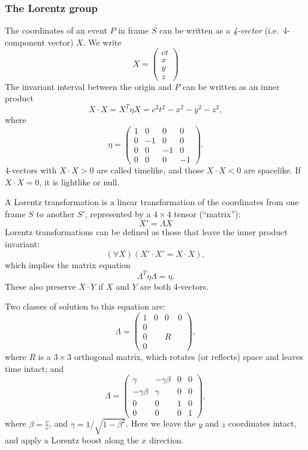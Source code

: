 \documentclass[a4paper]{article}
\begin{document}
\subsubsection*{The Lorentz group}
The coordinates of an event $P$ in frame $S$ can be written as a \emph{4-vector} (i.e.\ 4-component vector) $X$. We write
\[
  X =
  \begin{pmatrix}
    ct\\
    x\\
    y\\
    z
  \end{pmatrix}
\]
The invariant interval between the origin and $P$ can be written as an inner product
\[
  X\cdot X = X^T\eta X = c^2t^2 - x^2 - y^2 - z^2,
\]
where
\[
  \eta =
  \begin{pmatrix}
    1 & 0 & 0 & 0\\
    0 & -1 & 0 & 0\\
    0 & 0 & -1 & 0\\
    0 & 0 & 0 & -1
  \end{pmatrix}.
\]
4-vectors with $X\cdot X > 0$ are called timelike, and those $X \cdot X < 0$ are spacelike. If $X\cdot X = 0$, it is lightlike or null.

A Lorentz transformation is a linear transformation of the coordinates from one frame $S$ to another $S'$, represented by a $4\times 4$ tensor (``matrix''):
\[
  X' = \Lambda X
\]
Lorentz transformations can be defined as those that leave the inner product invariant:
\[
  (\forall X)(X'\cdot X' = X\cdot X),
\]
which implies the matrix equation
\[
  \Lambda^T\eta \Lambda = \eta.\tag{$*$}
\]
These also preserve $X\cdot Y$ if $X$ and $Y$ are both 4-vectors.

Two classes of solution to this equation are:
\[
  \Lambda =
  \begin{pmatrix}
    1 & 0 & 0 & 0\\
    0\\
    0 & & R\\
    0
  \end{pmatrix},
\]
where $R$ is a $3\times 3$ orthogonal matrix, which rotates (or reflects) space and leaves time intact; and
\[
  \Lambda =
  \begin{pmatrix}
    \gamma & -\gamma \beta & 0 & 0\\
    -\gamma\beta & \gamma & 0 & 0\\
    0 & 0 & 1 & 0\\
    0 & 0 & 0 & 1
  \end{pmatrix},
\]
where $\beta = \frac{v}{c}$, and $\gamma = 1/\sqrt{1 - \beta^2}$. Here we leave the $y$ and $z$ coordinates intact, and apply a Lorentz boost along the $x$ direction.
\end{document}
